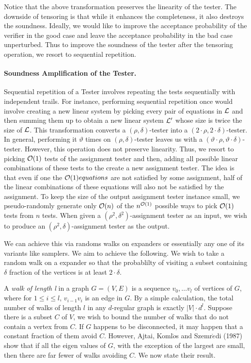 \noindent Notice that the above transformation preserves the linearity
of the tester. The downside of tensoring is that while it enhances the
completeness, it also destroys the soundness. Ideally, we would like
to improve the acceptance probability of the verifier in the good case
and leave the acceptance probability in the bad case unperturbed. Thus
to improve the soundness of the tester after the tensoring operation,
we resort to sequential repetition.

\paragraph{Soundness Amplification of the Tester.}
Sequential repetition of a Tester involves repeating the tests
sequentially with independent trails. For instance, performing
sequential repetition once would involve creating a new linear system
by picking every pair of equations in ${\cal L}$ and then summing them up
to obtain a new linear system ${\cal L}'$ whose size is twice the size of
${\cal L}$. This transformation converts a $(\rho, \delta)$-tester into a
$(2 \cdot \rho ,2 \cdot \delta)$-tester. In general, performing it
$\vartheta$ times on $(\rho , \delta)$-tester leaves us with a
$(\vartheta \cdot \rho, \vartheta \cdot \delta)$-tester.  However,
this operation does not preserve linearity. Thus, we resort to picking
${\cal O}(1)$ tests of the assignment tester and then, adding all
possible linear combinations of these tests to the create a new
assignment tester. The idea is that even if one the ${\cal O}(1)
equations$ are not satisfied by some assignment, half of the linear
combinations of these equations will also not be satisfied by the
assignment. To keep the size of the output assignment tester instance
small, we pseudo-randomly generate only ${\cal O}(n)$ of the $n^{{\cal
    O}(1)}$ possible ways to pick ${\cal O}(1)$ tests from $n$
tests. When given a $( \rho^2, \delta^2)$-assignment tester as an
input, we wish to produce an $(\rho^2, \delta)$-assignment tester as
the output.

We can achieve this via randoms walks on expanders or essentially any
one of its variants like samplers. We aim to achieve the following. We
wish to take a random walk on a expander so that the probablilty of
visiting a subset containing $\delta$ fraction of the vertices is at
least $2 \cdot \delta$.

A {\em walk of length l} in a graph $G = (V,E)$ is a sequence $v_0,
\ldots v_l$ of vertices of $G$, where for $1 \le i \le l$,
$v_{i-1}v_i$ is an edge in $G$. By a simple calculation, the total
number of walks of length $l$ in any $d$-regular graph is exactly
$|V|\cdot d^l$. Suppose there is a subset $C$ of $V$, we wish to bound
the number of walks that do not contain a vertex from $C$. If $G$
happens to be disconnected, it may happen that a constant fraction of
them avoid $C$. However, Ajtai, Koml$\grave{o}$s and
Szemr$\grave{e}$di (1987) show that if all the eigen values of $G$,
with the exception of the largest are small, then there are far fewer
of walks avoiding $C$. We now state their result.

